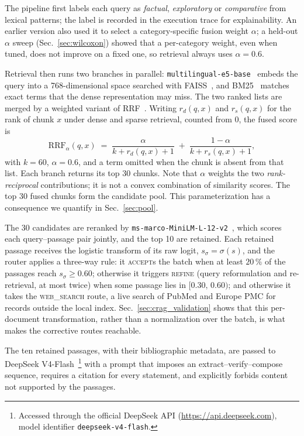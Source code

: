 \documentclass[runningheads]{llncs}
\begin{document}
The pipeline first labels each query as \textit{factual}, \textit{exploratory} or \textit{comparative} from lexical patterns; the label is recorded in the execution trace for explainability. An earlier version also used it to select a category-specific fusion weight $\alpha$; a held-out $\alpha$ sweep (Sec.~\ref{sec:wilcoxon}) showed that a per-category weight, even when tuned, does not improve on a fixed one, so retrieval always uses $\alpha{=}0.6$.

Retrieval then runs two branches in parallel: \texttt{multilingual-e5-base}~\cite{wang2024e5} embeds the query into a 768-dimensional space searched with FAISS~\cite{johnson2021billion}, and BM25~\cite{robertson2009bm25} matches exact terms that the dense representation may miss. The two ranked lists are merged by a weighted variant of RRF~\cite{cormack2009rrf}. Writing $r_d(q,x)$ and $r_s(q,x)$ for the rank of chunk $x$ under dense and sparse retrieval, counted from $0$, the fused score is
\begin{equation}
\label{eq:rrf}
\mathrm{RRF}_\alpha(q,x) \;=\; \frac{\alpha}{k + r_d(q,x) + 1} \;+\; \frac{1-\alpha}{k + r_s(q,x) + 1},
\end{equation}
with $k{=}60$, $\alpha{=}0.6$, and a term omitted when the chunk is absent from that list. Each branch returns its top 30 chunks. Note that $\alpha$ weights the two \emph{rank-reciprocal} contributions; it is not a convex combination of similarity scores. The top 30 fused chunks form the candidate pool. This parameterization has a consequence we quantify in Sec.~\ref{sec:pool}.

The 30 candidates are reranked by \texttt{ms-marco-MiniLM-L-12-v2}~\cite{nogueira2019passage}, which scores each query--passage pair jointly, and the top 10 are retained. Each retained passage receives the logistic transform of its raw logit, $s_\sigma{=}\sigma(s)$, and the router applies a three-way rule: it \textsc{accept}s the batch when at least $20\,\%$ of the passages reach $s_\sigma{\geq}0.60$; otherwise it triggers \textsc{refine} (query reformulation and re-retrieval, at most twice) when some passage lies in $[0.30,\,0.60)$; and otherwise it takes the \textsc{web\_search} route, a live search of PubMed and Europe PMC for records outside the local index. Sec.~\ref{sec:crag_validation} shows that this per-document transformation, rather than a normalization over the batch, is what makes the corrective routes reachable.

The ten retained passages, with their bibliographic metadata, are passed to DeepSeek V4-Flash~\cite{deepseek2026v4}\footnote{Accessed through the official DeepSeek API (\url{https://api.deepseek.com}), model identifier \texttt{deepseek-v4-flash}.} with a prompt that imposes an extract--verify--compose sequence, requires a citation for every statement, and explicitly forbids content not supported by the passages.
\end{document}

